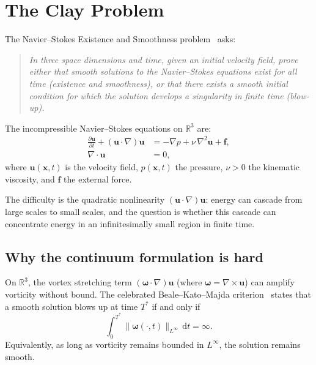 \documentclass[11pt]{article}
\theoremstyle{tight}
\theoremstyle{plainroman}
\newcommand{\R}{\mathbb{R}}
\newcommand{\dd}{\,\mathrm{d}}
\begin{document}
\section{The Clay Problem}

The Navier--Stokes Existence and Smoothness problem~\cite{clay} asks:

\begin{quotation}
\emph{In three space dimensions and time, given an initial velocity field, prove either that smooth solutions to the Navier--Stokes equations exist for all time (existence and smoothness), or that there exists a smooth initial condition for which the solution develops a singularity in finite time (blow-up).}
\end{quotation}

The incompressible Navier--Stokes equations on $\R^3$ are:
\begin{align}
\frac{\partial\mathbf u}{\partial t}+(\mathbf u\cdot\nabla)\mathbf u &=-\nabla p+\nu\,\nabla^2\mathbf u+\mathbf f, \label{eq:NS}\\
\nabla\cdot\mathbf u &= 0, \label{eq:incomp}
\end{align}
where $\mathbf u(\mathbf x,t)$ is the velocity field, $p(\mathbf x,t)$ the pressure, $\nu>0$ the kinematic viscosity, and $\mathbf f$ the external force.

The difficulty is the quadratic nonlinearity $(\mathbf u\cdot\nabla)\mathbf u$: energy can cascade from large scales to small scales, and the question is whether this cascade can concentrate energy in an infinitesimally small region in finite time.

\subsection{Why the continuum formulation is hard}

On $\R^3$, the vortex stretching term $(\bm\omega\cdot\nabla)\mathbf u$ (where $\bm\omega=\nabla\times\mathbf u$) can amplify vorticity without bound.
The celebrated Beale--Kato--Majda criterion~\cite{bkm} states that a smooth solution blows up at time $T^*$ if and only if
\begin{equation}\label{eq:bkm}
\int_0^{T^*}\|\bm\omega(\cdot,t)\|_{L^\infty}\dd t=\infty.
\end{equation}
Equivalently, as long as vorticity remains bounded in $L^\infty$, the solution remains smooth.
\end{document}
